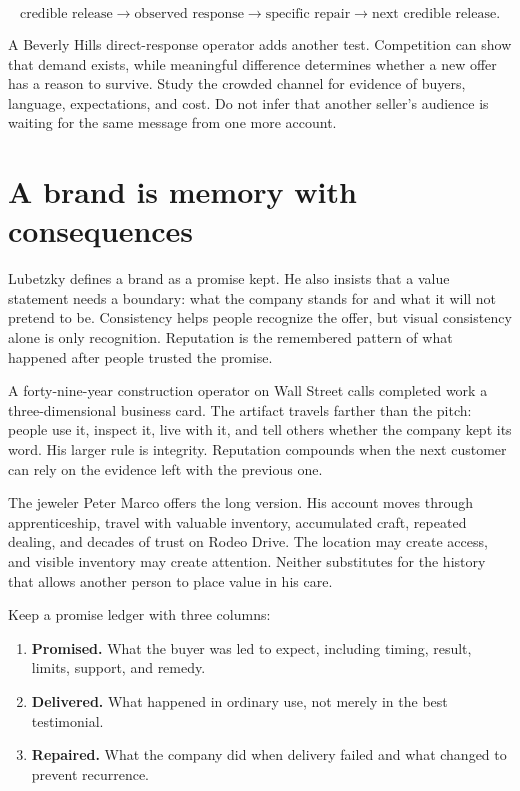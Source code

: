 \begin{equation}
\text{credible release}\longrightarrow\text{observed response}
\longrightarrow\text{specific repair}\longrightarrow
\text{next credible release}.
\end{equation}

A Beverly Hills direct-response operator adds another test. Competition can
show that demand exists, while meaningful difference determines whether a new
offer has a reason to survive. Study the crowded channel for evidence of
buyers, language, expectations, and cost. Do not infer that another seller's
audience is waiting for the same message from one more account.

\section{A brand is memory with consequences}

Lubetzky defines a brand as a promise kept. He also insists that a value
statement needs a boundary: what the company stands for and what it will not
pretend to be. Consistency helps people recognize the offer, but visual
consistency alone is only recognition. Reputation is the remembered pattern of
what happened after people trusted the promise.

A forty-nine-year construction operator on Wall Street calls completed work a
three-dimensional business card. The artifact travels farther than the pitch:
people use it, inspect it, live with it, and tell others whether the company
kept its word. His larger rule is integrity. Reputation compounds when the
next customer can rely on the evidence left with the previous one.

The jeweler Peter Marco offers the long version. His account moves through
apprenticeship, travel with valuable inventory, accumulated craft, repeated
dealing, and decades of trust on Rodeo Drive. The location may create access,
and visible inventory may create attention. Neither substitutes for the
history that allows another person to place value in his care.

Keep a promise ledger with three columns:

\begin{enumerate}[itemsep=0.12em]
\item \textbf{Promised.} What the buyer was led to expect, including timing,
  result, limits, support, and remedy.
\item \textbf{Delivered.} What happened in ordinary use, not merely in the best
  testimonial.
\item \textbf{Repaired.} What the company did when delivery failed and what
  changed to prevent recurrence.
\end{enumerate}

